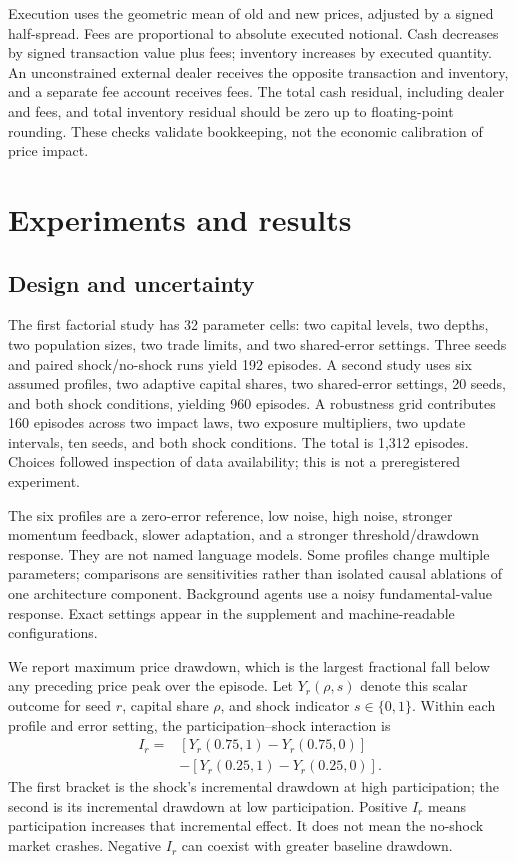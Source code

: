 Execution uses the geometric mean of old and new prices, adjusted by a signed half-spread. Fees are proportional to absolute executed notional. Cash decreases by signed transaction value plus fees; inventory increases by executed quantity. An unconstrained external dealer receives the opposite transaction and inventory, and a separate fee account receives fees. The total cash residual, including dealer and fees, and total inventory residual should be zero up to floating-point rounding. These checks validate bookkeeping, not the economic calibration of price impact.

\section{Experiments and results}
\subsection{Design and uncertainty}
The first factorial study has 32 parameter cells: two capital levels, two depths, two population sizes, two trade limits, and two shared-error settings. Three seeds and paired shock/no-shock runs yield 192 episodes. A second study uses six assumed profiles, two adaptive capital shares, two shared-error settings, 20 seeds, and both shock conditions, yielding 960 episodes. A robustness grid contributes 160 episodes across two impact laws, two exposure multipliers, two update intervals, ten seeds, and both shock conditions. The total is 1,312 episodes. Choices followed inspection of data availability; this is not a preregistered experiment.

The six profiles are a zero-error reference, low noise, high noise, stronger momentum feedback, slower adaptation, and a stronger threshold/drawdown response. They are not named language models. Some profiles change multiple parameters; comparisons are sensitivities rather than isolated causal ablations of one architecture component. Background agents use a noisy fundamental-value response. Exact settings appear in the supplement and machine-readable configurations.

We report maximum price drawdown, which is the largest fractional fall below any preceding price peak over the episode. Let $Y_r(\rho,s)$ denote this scalar outcome for seed $r$, capital share $\rho$, and shock indicator $s\in\{0,1\}$. Within each profile and error setting, the participation--shock interaction is
\begin{align}
 I_r={}&[Y_r(0.75,1)-Y_r(0.75,0)]\nonumber\\
       &-[Y_r(0.25,1)-Y_r(0.25,0)].
\end{align}
The first bracket is the shock's incremental drawdown at high participation; the second is its incremental drawdown at low participation. Positive $I_r$ means participation increases that incremental effect. It does not mean the no-shock market crashes. Negative $I_r$ can coexist with greater baseline drawdown.

